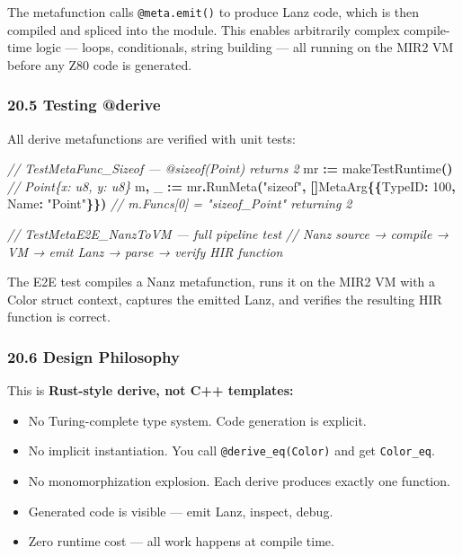\documentclass[
  11pt,
]{article}
\newenvironment{Shaded}{\begin{snugshade}}{\end{snugshade}}
\newcommand{\CommentTok}[1]{\textcolor[rgb]{0.56,0.35,0.01}{\textit{#1}}}
\newcommand{\DecValTok}[1]{\textcolor[rgb]{0.00,0.00,0.81}{#1}}
\newcommand{\NormalTok}[1]{#1}
\newcommand{\OperatorTok}[1]{\textcolor[rgb]{0.81,0.36,0.00}{\textbf{#1}}}
\newcommand{\StringTok}[1]{\textcolor[rgb]{0.31,0.60,0.02}{#1}}
\providecommand{\tightlist}{%
  \setlength{\itemsep}{0pt}\setlength{\parskip}{0pt}}
\begin{document}
The metafunction calls \texttt{@meta.emit()} to produce Lanz code, which
is then compiled and spliced into the module. This enables arbitrarily
complex compile-time logic --- loops, conditionals, string building ---
all running on the MIR2 VM before any Z80 code is generated.

\hypertarget{testing-derive}{%
\subsubsection{20.5 Testing @derive}\label{testing-derive}}

All derive metafunctions are verified with unit tests:

\begin{Shaded}
\begin{Highlighting}[]
\CommentTok{// TestMetaFunc\_Sizeof — @sizeof(Point) returns 2}
\NormalTok{mr }\OperatorTok{:=}\NormalTok{ makeTestRuntime}\OperatorTok{()}  \CommentTok{// Point\{x: u8, y: u8\}}
\NormalTok{m}\OperatorTok{,}\NormalTok{ \_ }\OperatorTok{:=}\NormalTok{ mr}\OperatorTok{.}\NormalTok{RunMeta}\OperatorTok{(}\StringTok{"sizeof"}\OperatorTok{,} \OperatorTok{[]}\NormalTok{MetaArg}\OperatorTok{\{\{}\NormalTok{TypeID}\OperatorTok{:} \DecValTok{100}\OperatorTok{,}\NormalTok{ Name}\OperatorTok{:} \StringTok{"Point"}\OperatorTok{\}\})}
\CommentTok{// m.Funcs[0] = "sizeof\_Point" returning 2}

\CommentTok{// TestMetaE2E\_NanzToVM — full pipeline test}
\CommentTok{// Nanz source → compile → VM → emit Lanz → parse → verify HIR function}
\end{Highlighting}
\end{Shaded}

The E2E test compiles a Nanz metafunction, runs it on the MIR2 VM with a
Color struct context, captures the emitted Lanz, and verifies the
resulting HIR function is correct.

\hypertarget{design-philosophy-1}{%
\subsubsection{20.6 Design Philosophy}\label{design-philosophy-1}}

This is \textbf{Rust-style derive, not C++ templates:}

\begin{itemize}
\tightlist
\item
  No Turing-complete type system. Code generation is explicit.
\item
  No implicit instantiation. You call \texttt{@derive\_eq(Color)} and
  get \texttt{Color\_eq}.
\item
  No monomorphization explosion. Each derive produces exactly one
  function.
\item
  Generated code is visible --- emit Lanz, inspect, debug.
\item
  Zero runtime cost --- all work happens at compile time.
\end{itemize}
\end{document}
